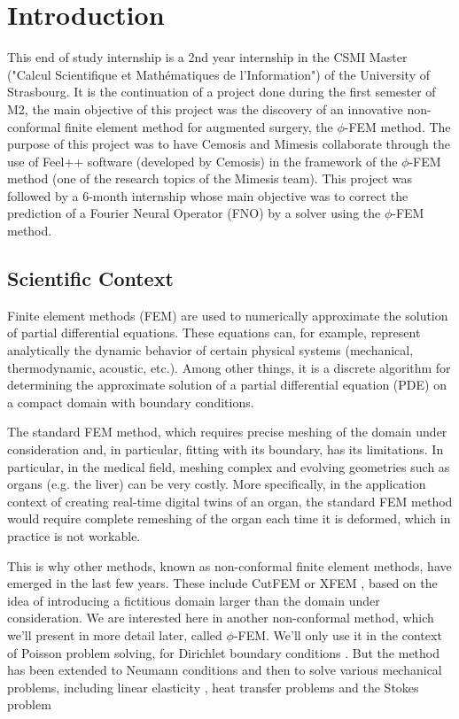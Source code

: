 \section{Introduction}

This end of study internship is a 2nd year internship in the CSMI Master ("Calcul Scientifique et Mathématiques de l'Information") of the University of Strasbourg. It is the continuation of a project done during the first semester of M2, the main objective of this project was the discovery of an innovative non-conformal finite element method for augmented surgery, the $\phi$-FEM method. The purpose of this project was to have Cemosis and Mimesis collaborate through the use of Feel++ software (developed by Cemosis) in the framework of the $\phi$-FEM method (one of the research topics of the Mimesis team). This project was followed by a 6-month internship whose main objective was to correct the prediction of a Fourier Neural Operator (FNO) by a solver using the $\phi$-FEM method.

\subsection{Scientific Context}

Finite element methods (FEM) are used to numerically approximate the solution of partial differential equations. These equations can, for example, represent analytically the dynamic behavior of certain physical systems (mechanical, thermodynamic, acoustic, etc.). Among other things, it is a discrete algorithm for determining the approximate solution of a partial differential equation (PDE) on a compact domain with boundary conditions. 

The standard FEM method, which requires precise meshing of the domain under consideration and, in particular, fitting with its boundary, has its limitations. In particular, in the medical field, meshing complex and evolving geometries such as organs (e.g. the liver) can be very costly. More specifically, in the application context of creating real-time digital twins of an organ, the standard FEM method would require complete remeshing of the organ each time it is deformed, which in practice is not workable. 

This is why other methods, known as non-conformal finite element methods, have emerged in the last few years. These include CutFEM \cite{burman_cutfem_2015} or XFEM \cite{moes_x-fem_2002}, based on the idea of introducing a fictitious domain larger than the domain under consideration. We are interested here in another non-conformal method, which we'll present in more detail later, called $\phi$-FEM. We'll only use it in the context of Poisson problem solving, for Dirichlet boundary conditions \cite{duprez_phi-fem_2020}. But the method has been extended to Neumann conditions \cite{duprez_new_2023} and then to solve various mechanical problems, including linear elasticity \cite[Chapter~2]{cotin_phi-fem_nodate}, heat transfer problems \cite[Chapter~5]{cotin_phi-fem_nodate} and the Stokes problem \cite{duprez_phi-fem_2023}

